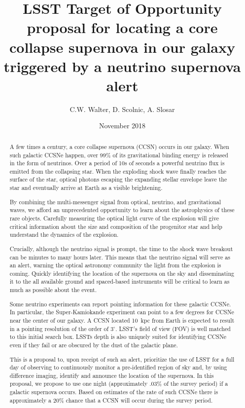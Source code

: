 \documentclass[11pt, letterpaper]{article}
\title{LSST Target of Opportunity proposal for locating a core collapse
  supernova in our galaxy triggered by a neutrino supernova alert}
\author{ C.W. Walter, D. Scolnic, A. Slosar}
\date{ November 2018}
\begin{document}
\maketitle

\begin{abstract}

  A few times a century, a core collapse supernova (CCSN) occurs in
  our galaxy. When such galactic CCSNe happen, over 99\% of its
  gravitational binding energy is released in the form of neutrinos.
  Over a period of 10s of seconds a powerful neutrino flux is emitted
  from the collapsing star.  When the exploding shock wave finally
  reaches the surface of the star, optical photons escaping the
  expanding stellar envelope leave the star and eventually arrive at
  Earth as a visible brightening.

  By combining the multi-messenger signal from optical, neutrino, and
  gravitational waves, we afford an unprecedented opportunity to learn
  about the astrophysics of these rare objects. Carefully measuring
  the optical light curve of the explosion will give critical
  information about the size and composition of the progenitor star
  and help understand the dynamics of the explosion.

  Crucially, although the neutrino signal is prompt, the time to the
  shock wave breakout can be minutes to many hours later.  This means
  that the neutrino signal will serve as an alert, warning the
  optical astronomy community the light from the explosion is coming.  
  Quickly identifying the location of the supernova on the sky and
  disseminating it to the all available ground and spaced-based
  instruments will be critical to learn as much as possible about the
  event.

  Some neutrino experiments can report pointing information for these
  galactic CCSNe. In particular, the Super-Kamiokande experiment can
  point to a few degrees for CCSNe near the center of our galaxy.  A
  CCSN located 10~kpc from Earth is expected to result in a pointing
  resolution of the order of $3^\circ$.  LSST's field of view (FOV) is
  well matched to this initial search box.  LSSTs depth is also
  uniquely suited for identifying CCSNe even if they fail or are
  obscured by the dust of the galactic plane.

  This is a proposal to, upon receipt of such an alert, prioritize the
  use of LSST for a full day of observing to continuously monitor a
  pre-identified region of sky and, by using difference imaging,
  identify and announce the location of the supernova. In this
  proposal, we propose to use one night (approximately .03\% of the
  survey period) if a galactic supernova occurs.  Based on estimates
  of the rate of such CCSNe there is approximately a 20\% chance that a
  CCSN will occur during the survey period.
  
\end{abstract}
\end{document}
